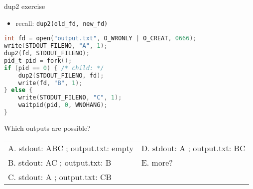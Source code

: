 \begin{frame}[fragile,label=dup2ex]{dup2 exercise}
\begin{itemize}
\item recall: \texttt{dup2(old\_fd, new\_fd)}
\end{itemize}
\begin{lstlisting}[language=C,style=small]
int fd = open("output.txt", O_WRONLY | O_CREAT, 0666);
write(STDOUT_FILENO, "A", 1);
dup2(fd, STDOUT_FILENO);
pid_t pid = fork();
if (pid == 0) { /* child: */
    dup2(STDOUT_FILENO, fd);
    write(fd, "B", 1);
} else {
    write(STODUT_FILENO, "C", 1);
    waitpid(pid, 0, WNOHANG);
}
\end{lstlisting}
Which outputs are possible?\\\small
\begin{tabular}{ll}
A. stdout: ABC ; output.txt: empty & D. stdout: A ; output.txt: BC \\
B. stdout: AC ; output.txt: B &  E. more? \\
C. stdout: A ; output.txt: CB \\
\end{tabular}
\end{frame}
